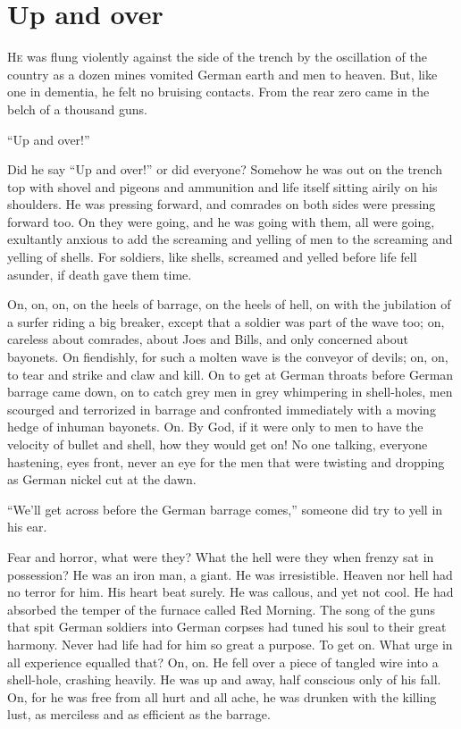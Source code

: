 \chapter*{\textsf{Up and over}}

H\textsc{e} was flung violently against the side of the trench by the oscillation of the country as a dozen mines vomited German earth and men to heaven. But, like one in dementia, he felt no bruising contacts. From the rear zero came in the belch of a thousand guns.

``Up and over!''

Did he say ``Up and over!'' or did everyone? Somehow he was out on the trench top with shovel and pigeons and ammunition and life itself sitting airily on his shoulders. He was pressing forward, and comrades on both sides were pressing forward too. On they were going, and he was going with them, all were going, exultantly anxious to add the screaming and yelling of men to the screaming and yelling of shells. For soldiers, like shells, screamed and yelled before life fell asunder, if death gave them time.

On, on, on, on the heels of barrage, on the heels of hell, on with the jubilation of a surfer riding a big breaker, except that a soldier was part of the wave too; on, careless about comrades, about Joes and Bills, and only concerned about bayonets. On fiendishly, for such a molten wave is the conveyor of devils; on, on, to tear and strike and claw and kill. On to get at German throats before German barrage came down, on to catch grey men in grey whimpering in shell-holes, men scourged and terrorized in barrage and confronted immediately with a moving hedge of inhuman bayonets. On. By God, if it were only to men to have the velocity of bullet and shell, how they would get on! No one talking, everyone hastening, eyes front, never an eye for the men that were twisting and dropping as German nickel cut at the dawn.

``We'll get across before the German barrage comes,'' someone did try to yell in his ear.

Fear and horror, what were they? What the hell were they when frenzy sat in possession? He was an iron man, a giant. He was irresistible. Heaven nor hell had no terror for him. His heart beat surely. He was callous, and yet not cool. He had absorbed the temper of the furnace called Red Morning. The song of the guns that spit German soldiers into German corpses had tuned his soul to their great harmony. Never had life had for him so great a purpose. To get on. What urge in all experience equalled that? On, on. He fell over a piece of tangled wire into a shell-hole, crashing heavily. He was up and away, half conscious only of his fall. On, for he was free from all hurt and all ache, he was drunken with the killing lust, as merciless and as efficient as the barrage.

